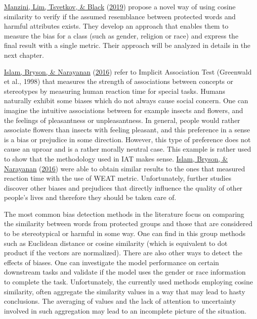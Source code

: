 \documentclass[
  12pt,
]{book}
\begin{document}
\protect\hyperlink{ref-Manzini2019blackToCriminal}{Manzini, Lim, Tsvetkov, \& Black} (\protect\hyperlink{ref-Manzini2019blackToCriminal}{2019}) propose a novel way of using cosine similarity to verify if the assumed resemblance between protected words and harmful attributes exists. They develop an approach that enables them to measure the bias for a class (such as gender, religion or race) and express the final result with a single metric. Their approach will be analyzed in details in the next chapter.

\protect\hyperlink{ref-Caliskan2017Semantics}{Islam, Bryson, \& Narayanan} (\protect\hyperlink{ref-Caliskan2017Semantics}{2016}) refer to Implicit Association Test (Greenwald et al., 1998) that measures the strength of associations between concepts or stereotypes by measuring human reaction time for special tasks. Humans naturally exhibit some biases which do not always cause social concern. One can imagine the intuitive associations between for example insects and flowers, and the feelings of pleasantness or unpleasantness. In general, people would rather associate flowers than insects with feeling pleasant, and this preference in a sense is a bias or
prejudice in some direction. However, this type of preference does not cause an uproar and is a rather morally neutral case. This example is rather used to show that the methodology used in IAT makes sense. \protect\hyperlink{ref-Caliskan2017Semantics}{Islam, Bryson, \& Narayanan} (\protect\hyperlink{ref-Caliskan2017Semantics}{2016}) were able to obtain similar results to the ones that measured reaction time with the use of WEAT metric. Unfortunately, further studies discover other biases and prejudices that directly influence the quality of other people's lives and therefore they should be taken care of.

The most common bias detection methods in the literature focus on comparing the similarity between words from protected groups and those that are considered to be stereotypical or harmful in some way. One can find in this group methods such as Euclidean distance or cosine similarity (which is equivalent to dot product if the vectors are normalized). There are also other ways to detect the effects of biases. One can investigate the model performance on certain downstream tasks and validate if the model uses the gender or race information to complete the task. Unfortunately, the currently used methods employing cosine similarity, often aggregate the similarity values in a way that may lead to hasty conclusions. The averaging of values and the lack of attention to uncertainty involved in such aggregation may lead to an incomplete picture of the situation.
\end{document}

